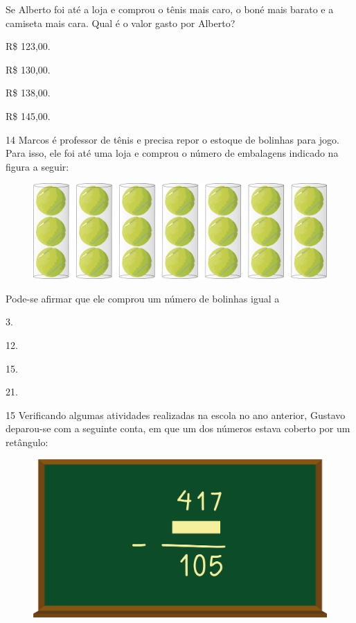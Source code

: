 Se Alberto foi até a loja e comprou o tênis mais caro, o boné mais barato e a camiseta mais cara. Qual é o valor gasto por Alberto?

\begin{multicols}{2}
\begin{escolha}
\item
  R\$ 123,00.
\item
  R\$ 130,00.
\item
  R\$ 138,00.
\item
  R\$ 145,00.
\end{escolha}
\end{multicols}

\num{14} Marcos é professor de tênis e  precisa repor o estoque de bolinhas para jogo. Para isso, ele foi até uma loja e comprou o número de embalagens indicado na figura a seguir:

\begin{figure}[htpb!]
\centering
\includegraphics[width=.8\textwidth]{./media/image121.png}
\end{figure}

Pode-se afirmar que ele comprou um número de bolinhas igual a

\begin{multicols}{2}
\begin{escolha}
\item
  3.
\item
  12.
\item
  15.
\item
  21.
\end{escolha}
\end{multicols}


\num{15} Verificando algumas atividades realizadas na escola no ano anterior, Gustavo deparou-se com a seguinte conta, em que um dos números estava
coberto por um retângulo:

\begin{figure}[htpb!]
\centering  
\includegraphics[width=\textwidth]{./media/image122.png}
\end{figure}

